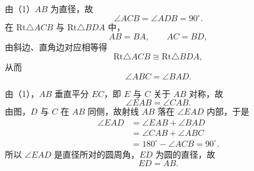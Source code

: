 \begin{answer}

由（1）$AB$ 为直径，故
\nopagebreak[4]
\[\angle ACB=\angle ADB=90^\circ.\]
在 $\mathrm{Rt}\triangle ACB$ 与 $\mathrm{Rt}\triangle BDA$ 中，
\nopagebreak[4]
\[AB=BA,\qquad AC=BD,\]
由斜边、直角边对应相等得
\nopagebreak[4]
\[\mathrm{Rt}\triangle ACB\cong\mathrm{Rt}\triangle BDA,\]
从而
\nopagebreak[4]
\[\angle ABC=\angle BAD.\]

由（1），$AB$ 垂直平分 $EC$，即 $E$ 与 $C$ 关于 $AB$ 对称，故
\nopagebreak[4]
\[\angle EAB=\angle CAB.\]
由图，$D$ 与 $C$ 在 $AB$ 同侧，故射线 $AB$ 落在 $\angle EAD$ 内部，于是
\nopagebreak[4]
\[\begin{aligned}
\angle EAD&=\angle EAB+\angle BAD\\
&=\angle CAB+\angle ABC\\
&=180^\circ-\angle ACB=90^\circ.
\end{aligned}\]
所以 $\angle EAD$ 是直径所对的圆周角，$ED$ 为圆的直径，故
\nopagebreak[4]
\[ED=AB.\]



\end{answer}
